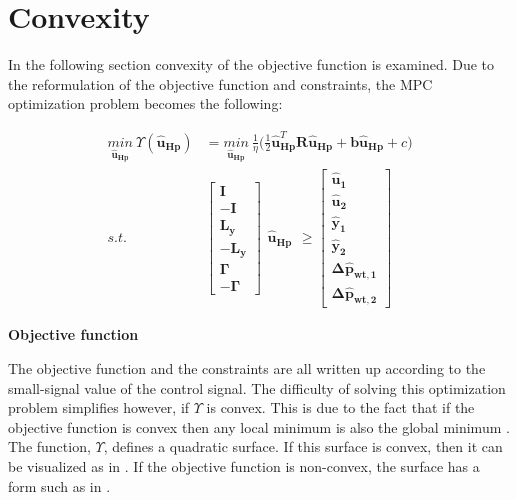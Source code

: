 \section{Convexity}
\label{convexity}
In the following section convexity of the objective function is examined. 
Due to the reformulation of the objective function and constraints, the MPC optimization problem becomes the following: 

\begin{align}
\underset{\bm{\hat{u}_{Hp}}}{min} \:  \Upsilon(\bm{\hat{u}}_{\bm{Hp}}) &= \underset{\bm{\hat{u}_{Hp}}}{min} \:  \frac{1}{\eta}\bigg( \frac{1}{2} \bm{\hat{u}}_{\bm{Hp}}^{T} \bm{R} \bm{\hat{u}}_{\bm{Hp}} + \bm{b} \bm{\hat{u}}_{\bm{Hp}} + c \bigg) \label{eq:obj_final1}\\
%
s.t. \:\:\:\:\:	&\begin{bmatrix}
		\bm{I} 	\\
		-\bm{I} 	\\
		\bm{L_{y}}	\\
		-\bm{L_{y}}	\\
		\bm{\Gamma}	\\
		-\bm{\Gamma}
	\end{bmatrix}
	\begin{matrix}
			\bm{\hat{u}_{Hp}}
	\end{matrix}
	\geq 
	\begin{bmatrix}
			\bm{\hat{u}_{1}}	\\
			\bm{\hat{u}_{2}}	\\
			\bm{\hat{y}_{1}}	\\
			\bm{\hat{y}_{2}}	\\
			\bm{\Delta \hat{p}_{wt,1}}	\\
			\bm{\Delta \hat{p}_{wt,2}}	
	\end{bmatrix} \nonumber
\end{align}

\textbf{Objective function}

The objective function and the constraints are all written up according to the small-signal value of the control signal. The difficulty of solving this optimization problem simplifies however, if $\Upsilon$ is convex. This is due to the fact that if the objective function is convex then any local minimum is also the global minimum \cite{Convex_constraints}.  
\\
The function, $\Upsilon$, defines a quadratic surface. If this surface is convex, then it can be visualized as in . If the objective function is non-convex, the surface has a form such as in . 

